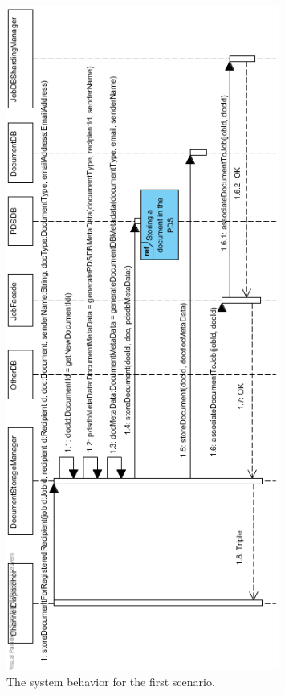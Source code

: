 \documentclass[a4paper,10pt]{article}
\begin{document}
\begin{figure}[!htp]
    \centering
    \includegraphics[width=0.8\textwidth]{StoringDocumentForRegisteredRecipients.png}
    \caption{The system behavior for the first scenario.
        }\label{fig:seq_StoreDocRegisteredRecipient}
\end{figure}
\end{document}
